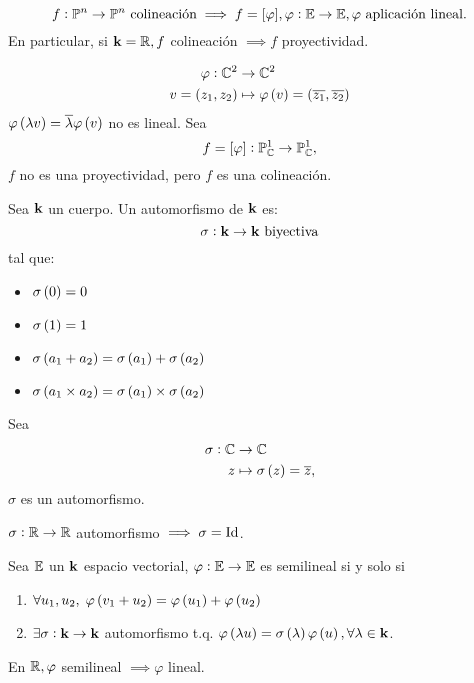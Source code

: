 \begin{teo}
	\[ f : \mathbb{P}^n \to \mathbb{P}^n \text{ colineación} \implies f = [\varphi], \varphi : \mathbb{E} \to \mathbb{E}, \varphi \text{ aplicación lineal}. \]
	En particular, si $\mathbf{k} = \mathbb{R}, f$ colineación $\implies f$ proyectividad.
\end{teo}
\begin{example}
	\begin{align*}
		\varphi : \mathbb{C}^2 &\to \mathbb{C}^2 \\
		v = \left( z_1, z_2 \right) &\mapsto \varphi \left( v \right) = \left( \overline{z_1}, \overline{z_2} \right)
	\end{align*}
	$\varphi \left( \lambda v \right) = \overline{\lambda} \varphi \left( v \right)$ no es lineal. Sea 
	\[ f = [\varphi] : \mathbb{P}^1_{\mathbb{C}} \to \mathbb{P}^1_{\mathbb{C}}, \]
	$f$ no es una proyectividad, pero $f$ es una colineación.
\end{example}
\begin{defi}
	Sea $\mathbf{k}$ un cuerpo. Un automorfismo de $\mathbf{k}$ es:
	\[ \sigma : \mathbf{k} \to \mathbf{k} \text{ biyectiva} \]
	tal que:
	\begin{itemize}
		\item $\sigma \left( 0 \right) = 0$
		\item $\sigma \left( 1 \right) = 1$
		\item $\sigma \left( a_1 + a_2 \right) = \sigma \left( a_1 \right) + \sigma \left( a_2 \right)$
		\item $\sigma \left( a_1 \times a_2 \right) = \sigma \left( a_1 \right) \times \sigma \left( a_2 \right)$
	\end{itemize}
\end{defi}
\begin{example}
	Sea
	\begin{align*}
		\sigma : \mathbb{C} &\to \mathbb{C} \\
		z &\mapsto \sigma \left( z \right) = \overline{z},
	\end{align*}
	$\sigma$ es un automorfismo.
\end{example}
\begin{ej}
	$\sigma : \mathbb{R} \to \mathbb{R}$ automorfismo $\implies \sigma = \operatorname{Id}$.
\end{ej}
\begin{defi}
	Sea $\mathbb{E}$ un $\mathbf{k}$ espacio vectorial, $\varphi : \mathbb{E} \to \mathbb{E}$ es semilineal si y solo si
	\begin{enumerate}[(1)]
		\item $\forall u_1, u_2, \; \varphi \left( v_1 + u_2 \right) = \varphi \left( u_1 \right) + \varphi \left( u_2 \right)$
		\item $\exists \sigma: \mathbf{k} \to \mathbf{k}$ automorfismo t.q. $\varphi \left( \lambda u \right) = \sigma \left( \lambda \right) \varphi \left( u \right), \forall \lambda \in \mathbf{k}$.
	\end{enumerate}
\end{defi}
\begin{obs}
	En $\mathbb{R}, \varphi$ semilineal $\implies \varphi$ lineal.
\end{obs}

